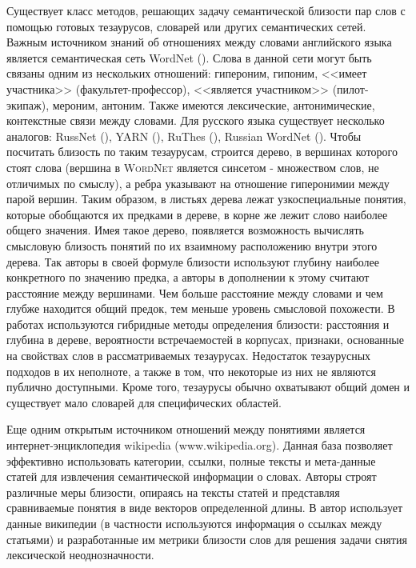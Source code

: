 Существует класс методов, решающих задачу семантической близости пар слов с помощью готовых тезаурусов, словарей или других семантических сетей. Важным источником знаний об отношениях между словами английского языка является семантическая сеть WordNet (\cite{wordnet}). Слова в данной сети могут быть связаны одним из нескольких отношений: гипероним, гипоним, <<имеет участника>> (факультет-профессор), <<является участником>> (пилот-экипаж), мероним, антоним. Также имеются лексические, антонимические, контекстные связи между словами. Для русского языка существует несколько аналогов: RussNet (\cite{russnet}), YARN (\cite{yarn, yarn_2}), RuThes (\cite{ruthes}), Russian WordNet (\cite{russian_wordnet}).  Чтобы посчитать близость по таким тезаурусам, строится дерево, в вершинах которого стоят слова (вершина в \textsc{WordNet} является синсетом - множеством слов, не отличимых по смыслу), а ребра указывают на отношение гиперонимии между парой вершин. Таким образом, в листьях дерева лежат узкоспециальные понятия, которые обобщаются их предками в дереве, в корне же лежит слово наиболее общего значения. Имея такое дерево, появляется возможность вычислять смысловую близость понятий по их взаимному расположению внутри этого дерева. Так авторы \cite{wordnet_sim_0} в своей формуле близости используют глубину наиболее конкретного по значению предка, а авторы  \cite{wordnet_sim_1} в дополнении к этому считают расстояние между вершинами. Чем больше расстояние между словами и чем глубже находится общий предок, тем меньше уровень смысловой похожести. В работах \cite{wordnet_hybrid_1,wordnet_hybrid_2} используются гибридные методы определения близости: расстояния и глубина в дереве, вероятности встречаемостей в корпусах, признаки, основанные на свойствах слов в рассматриваемых тезаурусах. Недостаток тезаурусных подходов в их неполноте, а также в том, что некоторые из них не являются публично доступными. Кроме того, тезаурусы обычно охватывают общий домен и существует мало словарей для специфических областей.

Еще одним открытым источником отношений между понятиями является интернет-энциклопедия wikipedia (www.wikipedia.org). Данная база позволяет эффективно использовать категории, ссылки, полные тексты и мета-данные статей для извлечения семантической информации о словах. Авторы \cite{wiki} строят различные меры близости, опираясь на тексты статей и представляя сравниваемые понятия в виде векторов определенной длины. В \cite{wiki_2} автор использует данные википедии (в частности используются информация о ссылках между статьями) и разработанные им метрики близости слов для решения задачи снятия лексической неоднозначности. 

